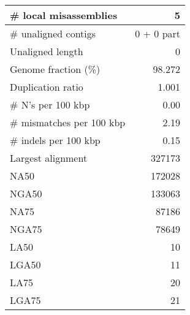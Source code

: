\documentclass[12pt,a4paper]{article}
\begin{document}
\begin{table}[ht]
\begin{center}
\begin{tabular}{|l*{1}{|r}|}
\# local misassemblies & 5 \\ \hline
\# unaligned contigs & 0 + 0 part \\ \hline
Unaligned length & 0 \\ \hline
Genome fraction (\%) & 98.272 \\ \hline
Duplication ratio & 1.001 \\ \hline
\# N's per 100 kbp & 0.00 \\ \hline
\# mismatches per 100 kbp & 2.19 \\ \hline
\# indels per 100 kbp & 0.15 \\ \hline
Largest alignment & 327173 \\ \hline
NA50 & 172028 \\ \hline
NGA50 & 133063 \\ \hline
NA75 & 87186 \\ \hline
NGA75 & 78649 \\ \hline
LA50 & 10 \\ \hline
LGA50 & 11 \\ \hline
LA75 & 20 \\ \hline
LGA75 & 21 \\ \hline
\end{tabular}
\end{center}
\end{table}
\end{document}
